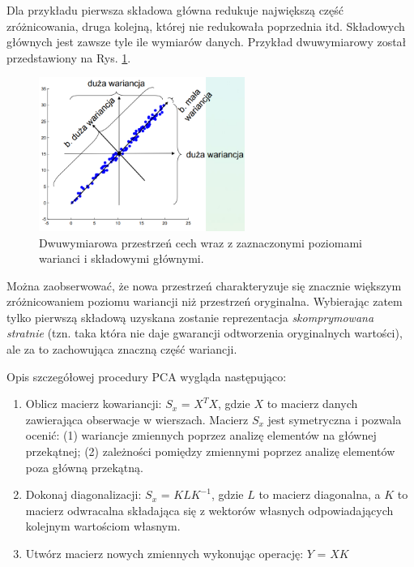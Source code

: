Dla przykładu pierwsza składowa główna redukuje największą część zróżnicowania, druga kolejną, której nie redukowała poprzednia itd. Składowych głównych jest zawsze tyle ile wymiarów danych. Przykład dwuwymiarowy został przedstawiony na Rys. \ref{PCA-2dim}.
\begin{figure}[h!]
	\centering
	\includegraphics[width=0.6\textwidth]{figures/PCA.png}
	\caption{Dwuwymiarowa przestrzeń cech wraz z zaznaczonymi poziomami warianci i składowymi głównymi.}
	\label{PCA-2dim}
\end{figure}
Można zaobserwować, że nowa przestrzeń charakteryzuje się znacznie większym zróżnicowaniem poziomu wariancji niż przestrzeń oryginalna. Wybierając zatem tylko pierwszą składową uzyskana zostanie reprezentacja \textit{skomprymowana stratnie} (tzn. taka która nie daje gwarancji odtworzenia oryginalnych wartości), ale za to zachowująca znaczną część wariancji.

Opis szczegółowej procedury PCA wygląda następująco:
\begin{enumerate}
\item Oblicz macierz kowariancji: $S_x$ = $X^{T}X$, gdzie $X$ to macierz danych zawierająca obserwacje w wierszach. Macierz $S_x$ jest symetryczna i pozwala ocenić: (1) wariancje zmiennych poprzez analizę elementów na głównej przekątnej; (2) zależności pomiędzy zmiennymi poprzez analizę elementów poza główną przekątną. 
\item Dokonaj diagonalizacji: $S_x$ = $KLK^{-1}$, gdzie $L$ to macierz diagonalna, a $K$ to macierz odwracalna składająca się z wektorów własnych odpowiadających kolejnym wartościom własnym.
\item Utwórz macierz nowych zmiennych wykonując operację: $Y$ = $XK$
\end{enumerate}

